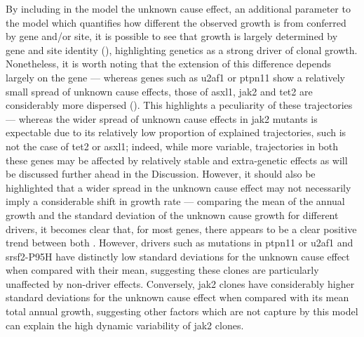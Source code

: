 \begin{figure}[!ht]
	\label{fig:ch-trunc}
\end{figure}

By including in the model the unknown cause effect, an additional parameter to the model which quantifies how different the observed growth is from conferred by gene and/or site, it is possible to see that growth is largely determined by gene and site identity (), highlighting genetics as a strong driver of clonal growth. Nonetheless, it is worth noting that the extension of this difference depends largely on the gene --- whereas genes such as \ac{u2af1} or \ac{ptpn11} show a relatively small spread of unknown cause effects, those of \ac{asxl1}, \ac{jak2} and \ac{tet2} are considerably more dispersed (). This highlights a peculiarity of these trajectories --- whereas the wider spread of unknown cause effects in \ac{jak2} mutants is expectable due to its relatively low proportion of explained trajectories, such is not the case of \ac{tet2} or \ac{asxl1}; indeed, while more variable, trajectories in both these genes may be affected by relatively stable and extra-genetic effects as will be discussed further ahead in the Discussion. However, it should also be highlighted that a wider spread in the unknown cause effect may not necessarily imply a considerable shift in growth rate --- comparing the mean of the annual growth and the standard deviation of the unknown cause growth for different drivers, it becomes clear that, for most genes, there appears to be a clear positive trend between both . However, drivers such as mutations in \ac{ptpn11} or \ac{u2af1} and \ac{srsf2}-P95H have distinctly low standard deviations for the unknown cause effect when compared with their mean, suggesting these clones are particularly unaffected by non-driver effects. Conversely, \ac{jak2} clones have considerably higher standard deviations for the unknown cause effect when compared with its mean total annual growth, suggesting other factors which are not capture by this model can explain the high dynamic variability of \ac{jak2} clones.

\begin{figure}[!ht]
	\label{fig:ch-genetic-vs-unknown}
\end{figure}

